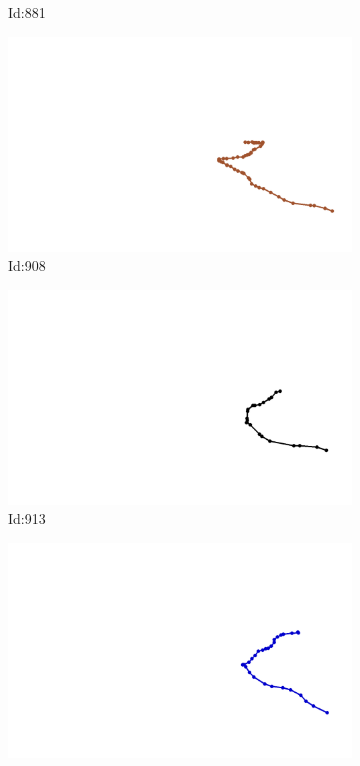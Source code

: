 \documentclass[12pt,twoside]{report}
\begin{document}
\begin{figure}
\begin{subfigure}[b]{0.20\textwidth}
\caption{Id:881}
\end{subfigure}
\begin{subfigure}[b]{0.20\textwidth}
\centering
\includegraphics[width=\textwidth]{../trajectories/908.png}
\caption{Id:908}
\end{subfigure}
\begin{subfigure}[b]{0.20\textwidth}
\centering
\includegraphics[width=\textwidth]{../trajectories/913.png}
\caption{Id:913}
\end{subfigure}
\begin{subfigure}[b]{0.20\textwidth}
\centering
\includegraphics[width=\textwidth]{../trajectories/973.png}

\end{subfigure}
\end{figure}
\end{document}
